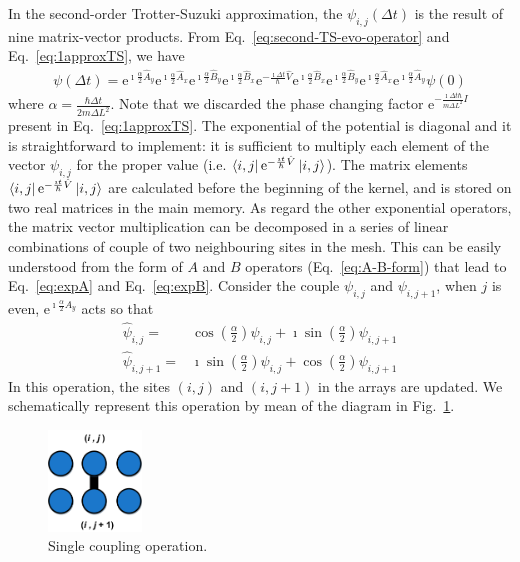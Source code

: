 In the second-order Trotter-Suzuki approximation, the $\psi_{i,j}(\Delta t)$ is the result of nine matrix-vector products. From Eq.~\eqref{eq:second-TS-evo-operator} and Eq.~\eqref{eq:1approxTS}, we have
\begin{align} \label{eq:single-iteration}
\psi(\Delta t) = \mathrm{e}^{\imath \frac{\alpha}{2} \hat{A}_y} \mathrm{e}^{\imath \frac{\alpha}{2} \hat{A}_x}   \mathrm{e}^{\imath \frac{\alpha}{2} \hat{B}_y} \mathrm{e}^{\imath \frac{\alpha}{2} \hat{B}_x}  \mathrm{e}^{-\frac{\imath \Delta t}{\hbar}\hat{V}} \mathrm{e}^{\imath \frac{\alpha}{2} \hat{B}_x} \mathrm{e}^{\imath \frac{\alpha}{2} \hat{B}_y} \mathrm{e}^{\imath \frac{\alpha}{2} \hat{A}_x} \mathrm{e}^{\imath \frac{\alpha}{2} \hat{A}_y} \psi(0)
\end{align}
where $\alpha = \frac{\hbar \Delta t}{2m\Delta L^2}$. Note that we discarded the phase changing factor $\mathrm{e}^{-\frac{\imath \Delta t \hbar}{m \Delta L^2} I}$ present in Eq.~\eqref{eq:1approxTS}. The exponential of the potential is diagonal and it is straightforward to implement: it is sufficient to multiply each element of the vector $\psi_{i,j}$ for the proper value (i.e. $\bra{i,j} \mathrm{e}^{-\frac{\imath t}{\hbar} \hat{V}} \ket{i,j}$). The matrix elements $\bra{i,j} \mathrm{e}^{-\frac{\imath t}{\hbar} \hat{V}} \ket{i,j}$ are calculated before the beginning of the kernel, and is stored on two real matrices in the main memory. As regard the other exponential operators, the matrix vector multiplication can be decomposed in a series of linear combinations of couple of two neighbouring sites in the mesh. This can be easily understood from the form of $A$ and $B$ operators (Eq.~\eqref{eq:A-B-form}) that lead to Eq.~\eqref{eq:expA} and Eq.~\eqref{eq:expB}. Consider the couple $\psi_{i,j}$ and $\psi_{i,j+1}$, when $j$ is even, $\mathrm{e}^{\imath \frac{\alpha}{2} A_y}$ acts so that
\begin{align} \label{eq:single-coupling-operation}
\hat{\psi}_{i,j} = & \cos\left(\frac{\alpha}{2}\right) \psi_{i,j} + \imath \sin\left(\frac{\alpha}{2}\right) \psi_{i,j+1} \nonumber \\ 
\hat{\psi}_{i,j+1} = & \imath\sin\left(\frac{\alpha}{2}\right) \psi_{i,j} + \cos\left(\frac{\alpha}{2}\right) \psi_{i,j+1} 
\end{align}
In this operation, the sites $(i,j)$ and $(i,j+1)$ in the arrays are updated. We schematically represent this operation by mean of the diagram in Fig.~\ref{fig:scheme-single-iteration}.
\begin{figure}
   \centering
   \includegraphics[width=2.5cm]{Figs/Single_couple.png}
   \caption{Single coupling operation.} \label{fig:scheme-single-iteration}
\end{figure}
